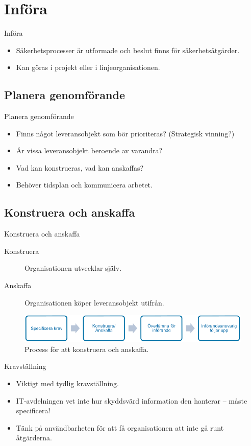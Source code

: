 \documentclass{beamer}
\begin{document}
\section{Införa}
\begin{frame}{Införa}
  \begin{itemize}
    \item Säkerhetsprocesser är utformade och beslut finns för 
      säkerhetsåtgärder.
    \item Kan göras i projekt eller i linjeorganisationen.
  \end{itemize}
\end{frame}

\subsection{Planera genomförande}
\begin{frame}{Planera genomförande}
  \begin{itemize}
    \item Finns något leveransobjekt som bör prioriteras?
      (Strategisk vinning?)
    \item Är vissa leveransobjekt beroende av varandra?
    \item Vad kan konstrueras, vad kan anskaffas?
    \item Behöver tidsplan och kommunicera arbetet.
  \end{itemize}
\end{frame}

\subsection{Konstruera och anskaffa}
\begin{frame}{Konstruera och anskaffa}
  \begin{description}
    \item[Konstruera] Organisationen utvecklar själv.
    \item[Anskaffa] Organisationen köper leveransobjekt utifrån.
  \end{description}
  \begin{figure}
    \includegraphics[width=\textwidth]{infora.png}
    \caption{Process för att konstruera och anskaffa.}
  \end{figure}
\end{frame}
\begin{frame}{Kravställning}
  \begin{itemize}
    \item Viktigt med tydlig kravställning.
    \item IT-avdelningen vet inte hur skyddsvärd information den hanterar -- 
      måste specificera!
    \item Tänk på användbarheten för att få organisationen att inte gå runt 
      åtgärderna.
  \end{itemize}
\end{frame}
\end{document}
